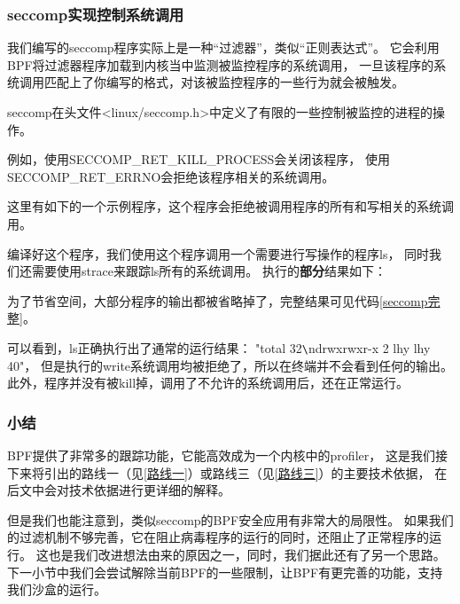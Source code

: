 \documentclass[AutoFakeBold,a4paper]{ctexart}
\begin{document}
\subsubsection{seccomp实现控制系统调用}

我们编写的seccomp程序实际上是一种“过滤器”，类似“正则表达式”。
它会利用BPF将过滤器程序加载到内核当中监测被监控程序的系统调用，
一旦该程序的系统调用匹配上了你编写的格式，对该被监控程序的一些行为就会被触发。

seccomp在头文件{\ttfamily <linux/seccomp.h>}中定义了有限的一些控制被监控的进程的操作。



例如，使用{\ttfamily SECCOMP\_RET\_KILL\_PROCESS}会关闭该程序，
使用{\ttfamily SECCOMP\_RET\_ERRNO}会拒绝该程序相关的系统调用。

这里有如下的一个示例程序，这个程序会拒绝被调用程序的所有和写相关的系统调用。



编译好这个程序，我们使用这个程序调用一个需要进行写操作的程序{\ttfamily ls}，
同时我们还需要使用{\ttfamily strace}来跟踪{\ttfamily ls}所有的系统调用。
执行的\textbf{部分}结果如下：



为了节省空间，大部分程序的输出都被省略掉了，完整结果可见代码\ref{seccomp完整}。

可以看到，{\ttfamily ls}正确执行出了通常的运行结果：
{\ttfamily "total 32\verb|\|ndrwxrwxr-x 2 lhy lhy 40"}，
但是执行的{\ttfamily write}系统调用均被拒绝了，所以在终端并不会看到任何的输出。
此外，程序并没有被kill掉，调用了不允许的系统调用后，还在正常运行。

\subsubsection{小结}

BPF提供了非常多的跟踪功能，它能高效成为一个内核中的profiler，
这是我们接下来将引出的路线一（见\ref{路线一}）或路线三（见\ref{路线三}）的主要技术依据，
在后文中会对技术依据进行更详细的解释。

但是我们也能注意到，类似seccomp的BPF安全应用有非常大的局限性。
如果我们的过滤机制不够完善，它在阻止病毒程序的运行的同时，还阻止了正常程序的运行。
这也是我们改进想法由来的原因之一，同时，我们据此还有了另一个思路。
下一小节中我们会尝试解除当前BPF的一些限制，让BPF有更完善的功能，支持我们沙盒的运行。
\end{document}
